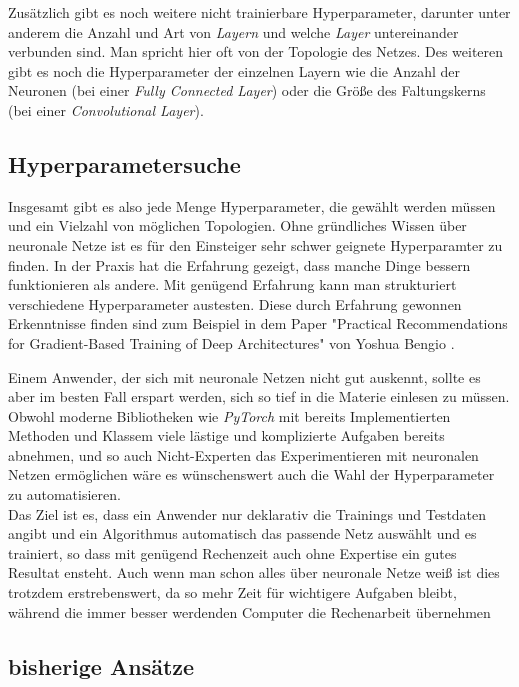 \documentclass[]{scrartcl}
\begin{document}
		Zusätzlich gibt es noch weitere nicht trainierbare Hyperparameter, darunter unter anderem die Anzahl und Art von \textit{Layern} und welche \textit{Layer} untereinander verbunden sind.
		Man spricht hier oft von der Topologie des Netzes. Des weiteren gibt es noch die Hyperparameter der einzelnen Layern wie
		die Anzahl der Neuronen (bei einer \textit{Fully Connected Layer}) oder die Größe des Faltungskerns (bei einer \textit{Convolutional Layer}).
	
	\subsection{Hyperparametersuche}
		Insgesamt gibt es also jede Menge Hyperparameter, die gewählt werden müssen und ein Vielzahl von möglichen Topologien. Ohne gründliches Wissen über neuronale Netze
		ist es für den Einsteiger sehr schwer geignete Hyperparamter zu finden. In der Praxis hat die Erfahrung gezeigt, dass manche Dinge bessern funktionieren als andere.
		Mit genügend Erfahrung kann man strukturiert verschiedene Hyperparameter austesten. Diese durch Erfahrung gewonnen Erkenntnisse finden sind zum Beispiel in dem Paper
		"Practical Recommendations for Gradient-Based Training of Deep Architectures" von Yoshua Bengio \cite{parameters}.

		Einem Anwender, der sich mit neuronale Netzen nicht gut auskennt, sollte es aber im besten Fall erspart werden, sich so tief in die Materie einlesen zu müssen.
		Obwohl moderne Bibliotheken wie \textit{PyTorch} mit bereits Implementierten Methoden und Klassem viele lästige und komplizierte Aufgaben bereits abnehmen,
		und so auch Nicht-Experten das Experimentieren mit neuronalen Netzen ermöglichen wäre es wünschenswert auch die Wahl der Hyperparameter zu automatisieren.\\

		Das Ziel ist es, dass ein Anwender nur deklarativ die Trainings und Testdaten angibt und ein Algorithmus automatisch das passende Netz auswählt und
		es trainiert, so dass mit genügend Rechenzeit auch ohne Expertise ein gutes Resultat ensteht.
		Auch wenn man schon alles über neuronale Netze weiß ist dies trotzdem erstrebenswert, da so mehr Zeit für wichtigere Aufgaben bleibt,
		während die immer besser werdenden Computer die Rechenarbeit übernehmen

	\subsection{bisherige Ansätze}\label{ansatz}
\end{document}
